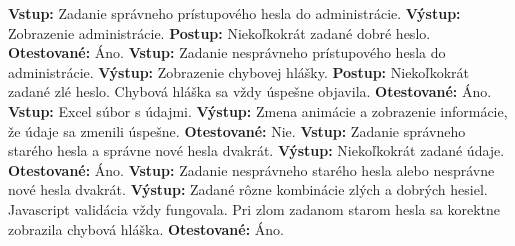 \documentclass[12pt,a4paper]{report}
\begin{document}
\begin{flushleft}
\textbf{Vstup:} Zadanie správneho prístupového hesla do administrácie.\linebreak
\textbf{Výstup:} Zobrazenie administrácie.\linebreak
\textbf{Postup:} Niekoľkokrát zadané dobré heslo. \linebreak
\textbf{Otestované:} Áno.\linebreak
\linebreak
\textbf{Vstup:} Zadanie nesprávneho prístupového hesla do administrácie.\linebreak
\textbf{Výstup:} Zobrazenie chybovej hlášky.\linebreak
\textbf{Postup:} Niekoľkokrát zadané zlé heslo. Chybová hláška sa vždy úspešne objavila. \linebreak
\textbf{Otestované:} Áno.\linebreak
\linebreak
\textbf{Vstup:} Excel súbor s údajmi.\linebreak
\textbf{Výstup:} Zmena animácie a zobrazenie informácie, že údaje sa zmenili úspešne.\linebreak
\textbf{Otestované:} Nie.\linebreak
\linebreak
\textbf{Vstup:} Zadanie správneho starého hesla a správne nové hesla dvakrát.\linebreak
\textbf{Výstup:} Niekoľkokrát zadané údaje.\linebreak
\textbf{Otestované:} Áno.\linebreak
\linebreak
\textbf{Vstup:} Zadanie nesprávneho starého hesla alebo nesprávne nové hesla dvakrát.\linebreak
\textbf{Výstup:} Zadané rôzne kombinácie zlých a dobrých hesiel. Javascript validácia vždy fungovala. Pri zlom zadanom starom hesla sa korektne zobrazila chybová hláška. \linebreak
\textbf{Otestované:} Áno.\linebreak
\end{flushleft}
\end{document}
